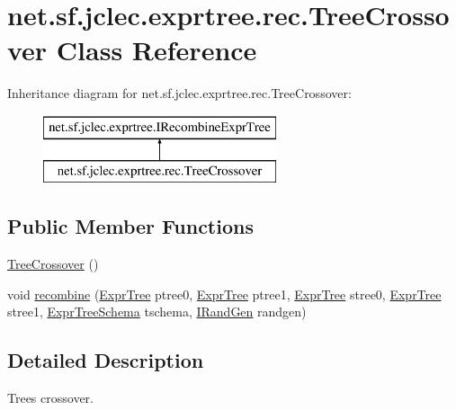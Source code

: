 \hypertarget{classnet_1_1sf_1_1jclec_1_1exprtree_1_1rec_1_1_tree_crossover}{\section{net.\-sf.\-jclec.\-exprtree.\-rec.\-Tree\-Crossover Class Reference}
\label{classnet_1_1sf_1_1jclec_1_1exprtree_1_1rec_1_1_tree_crossover}
}
Inheritance diagram for net.\-sf.\-jclec.\-exprtree.\-rec.\-Tree\-Crossover\-:\begin{figure}[H]
\begin{center}
\leavevmode
\includegraphics[height=2.000000cm]{classnet_1_1sf_1_1jclec_1_1exprtree_1_1rec_1_1_tree_crossover}
\end{center}
\end{figure}
\subsection*{Public Member Functions}
\begin{DoxyCompactItemize}
\item 
\hyperlink{classnet_1_1sf_1_1jclec_1_1exprtree_1_1rec_1_1_tree_crossover_a09a8c8d784fbf3f6d1786e6f4e84d574}{Tree\-Crossover} ()
\item 
void \hyperlink{classnet_1_1sf_1_1jclec_1_1exprtree_1_1rec_1_1_tree_crossover_ac02138e70606ada5202891befc6d5737}{recombine} (\hyperlink{classnet_1_1sf_1_1jclec_1_1exprtree_1_1_expr_tree}{Expr\-Tree} ptree0, \hyperlink{classnet_1_1sf_1_1jclec_1_1exprtree_1_1_expr_tree}{Expr\-Tree} ptree1, \hyperlink{classnet_1_1sf_1_1jclec_1_1exprtree_1_1_expr_tree}{Expr\-Tree} stree0, \hyperlink{classnet_1_1sf_1_1jclec_1_1exprtree_1_1_expr_tree}{Expr\-Tree} stree1, \hyperlink{classnet_1_1sf_1_1jclec_1_1exprtree_1_1_expr_tree_schema}{Expr\-Tree\-Schema} tschema, \hyperlink{interfacenet_1_1sf_1_1jclec_1_1util_1_1random_1_1_i_rand_gen}{I\-Rand\-Gen} randgen)
\end{DoxyCompactItemize}


\subsection{Detailed Description}
Trees crossover.


